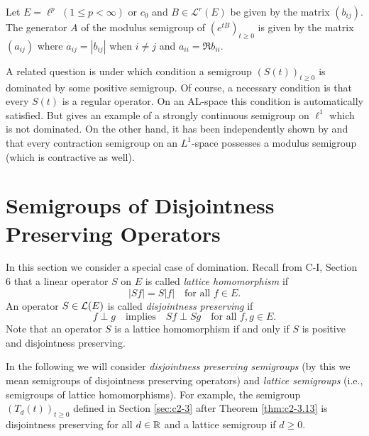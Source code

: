 \begin{example}\label{ex:c2-4.19}
Let $E = \ell^{p}$ $(1 \leq p < \infty)$ or $c_{0}$ and $B \in \mathcal{L}^{r}(E)$ be
given by the matrix $(b_{ij})$.
The generator $A$ of the modulus semigroup of $(e^{tB})_{t \geq 0}$ is given by the matrix $(a_{ij})$ where $a_{ij} = |b_{ij}|$ when $i \neq j$ and $a_{ii} = \Re  b_{ii}$.
\end{example}

A related question is under which condition a semigroup $(S(t))_{t \geq 0}$ is
dominated by some positive semigroup.
Of course, a necessary condition is that every $S(t)$ is a regular operator.
On an AL-space this condition is automatically satisfied.
But \citet{kipnis:1974} gives an example of a strongly continuous semigroup on $\ell^{1}$ which is not dominated.
On the other hand, it has been independently shown by \citet{kipnis:1974} and
\citet{kubokawe:1975} that every contraction semigroup on an $L^{1}$-space
possesses a modulus semigroup (which is contractive as well).
\section{Semigroups of Disjointness Preserving Operators} \label{sec:c2-5}

In this section we consider a special case of domination. 
Recall from C-I, Section 6 
that a linear operator $S$ on $E$ is called \emph{lattice homomorphism} if
\begin{equation}\label{eq:c2-5.1}
|Sf| = S|f| \quad \text{for all } f \in E.
\end{equation}
An operator $S \in \mathcal{L}(E)$ is called \emph{disjointness preserving} if
\begin{equation}\label{eq:c2-5.2}
f \perp g \quad \text{implies} \quad Sf \perp Sg \quad \text{for all } f,g \in E.
\end{equation}
Note that an operator $S$ is a lattice homomorphism if and only if $S$
is positive and disjointness preserving.

In the following we will consider \emph{disjointness preserving semigroups}
(by this we mean semigroups of disjointness preserving operators) and
\emph{lattice semigroups} (i.e., semigroups of lattice homomorphisms). For
example, the semigroup $(T_{d}(t))_{t \geq 0}$ defined in Section \ref{sec:c2-3} after Theorem \ref{thm:c2-3.13}  is disjointness preserving for all $d \in \mathbb{R}$ and a lattice semigroup if $d \geq 0$.

